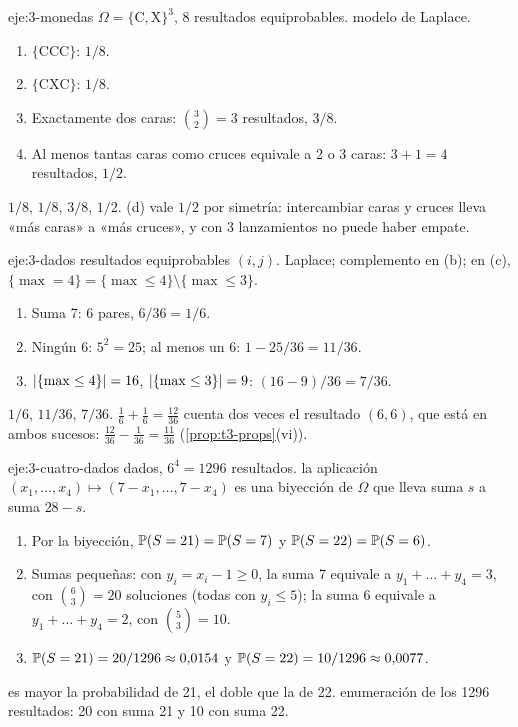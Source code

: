 \begin{solucion}{eje:3-monedas}
\datos $\Omega=\{\mathrm C,\mathrm X\}^{3}$, 8 resultados equiprobables.
\planteamiento modelo de Laplace.
\pasos
\begin{enumerate}[label=(\alph*)]
  \item $\{\mathrm{CCC}\}$: $1/8$.
  \item $\{\mathrm{CXC}\}$: $1/8$.
  \item Exactamente dos caras: $\binom32=3$ resultados, $3/8$.
  \item Al menos tantas caras como cruces equivale a 2 o 3 caras: $3+1=4$ resultados, $1/2$.
\end{enumerate}
\resultado $1/8$, $1/8$, $3/8$, $1/2$.
\comprobacion (d) vale $1/2$ por simetría: intercambiar caras y cruces lleva «más caras» a «más cruces», y con 3 lanzamientos no puede haber empate.
\end{solucion}

\begin{solucion}{eje:3-dados}
 resultados equiprobables $(i,j)$.
\planteamiento Laplace; complemento en (b); en (c), $\{\max=4\}=\{\max\le4\}\setminus\{\max\le3\}$.
\pasos
\begin{enumerate}[label=(\alph*)]
  \item Suma 7: 6 pares, $6/36=1/6$.
  \item Ningún 6: $5^{2}=25$; al menos un 6: $1-25/36=11/36$.
  \item $\lvert\{\max\le4\}\rvert=16$, $\lvert\{\max\le3\}\rvert=9$: $(16-9)/36=7/36$.
\end{enumerate}
\resultado $1/6$, $11/36$, $7/36$.
\comprobacion $\frac16+\frac16=\frac{12}{36}$ cuenta dos veces el resultado $(6,6)$, que está en ambos sucesos: $\frac{12}{36}-\frac1{36}=\frac{11}{36}$ (\cref{prop:t3-props}(vi)).
\end{solucion}

\begin{solucion}{eje:3-cuatro-dados}
 dados, $6^{4}=1296$ resultados.
\planteamiento la aplicación $(x_1,\dots,x_4)\mapsto(7-x_1,\dots,7-x_4)$ es una biyección de $\Omega$ que lleva suma $s$ a suma $28-s$.
\pasos
\begin{enumerate}[label=\arabic*.]
  \item Por la biyección, $\mathbb{P}(S=21)=\mathbb{P}(S=7)$ y $\mathbb{P}(S=22)=\mathbb{P}(S=6)$.
  \item Sumas pequeñas: con $y_i=x_i-1\ge0$, la suma 7 equivale a $y_1+\dots+y_4=3$, con $\binom63=20$ soluciones (todas con $y_i\le5$); la suma 6 equivale a $y_1+\dots+y_4=2$, con $\binom53=10$.
  \item $\mathbb{P}(S=21)=20/1296\approx0{,}0154$ y $\mathbb{P}(S=22)=10/1296\approx0{,}0077$.
\end{enumerate}
\resultado es mayor la probabilidad de 21, el doble que la de 22.
\comprobacion enumeración de los 1296 resultados: 20 con suma 21 y 10 con suma 22.
\end{solucion}

